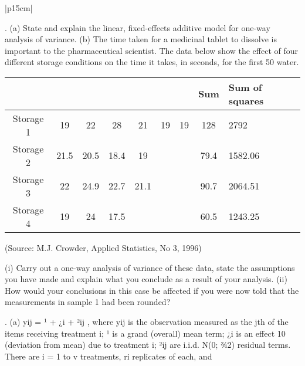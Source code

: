 \documentclass[a4paper,12pt]{article}
\begin{document}
\begin{table}[ht!]
     
\centering
     
\begin{tabular}{|p{15cm}|}
     
. (a) State and explain the linear, fixed-effects additive model for one-way analysis of
variance.
(b) The time taken for a medicinal tablet to dissolve is important to the pharmaceutical
scientist. The data below show the effect of four different storage conditions on the
time it takes, in seconds, for the first 50%
water.


\begin{center}
\begin{tabular}{|c|c|c|c|c|c|c|c|}

	&		&		&		&		&		&		&	Sum	&	 Sum of
squares	\\  \hline
Storage 1 	&	19	&	22	&	28	&	21	&	19	&	19	&	128	&	2792	\\  \hline
Storage 2 	&	21.5	&	20.5	&	18.4	&	19	&		&		&	79.4	&	1582.06	\\  \hline
Storage 3 	&	22	&	24.9	&	22.7	&	21.1	&		&		&	90.7	&	2064.51	\\  \hline
Storage 4	&	19	&	24	&	17.5	&		&		&		&	60.5	&	1243.25	\\  \hline
\end{tabular}
\end{center}
(Source: M.J. Crowder, Applied Statistics, No 3, 1996)

(i) Carry out a one-way analysis of variance of these data, state the assumptions you
have made and explain what you conclude as a result of your analysis.
(ii) How would your conclusions in this case be affected if you were now told that the
measurements in sample 1 had been rounded?
\\ \hline
      
\end{tabular}
    
\end{table}
. (a) yij = ¹ + ¿i + ²ij , where yij is the observation measured as the jth of the
items receiving treatment i; ¹ is a grand (overall) mean term; ¿i is an effect
10
(deviation from mean) due to treatment i; ²ij are i.i.d. N(0; ¾2) residual
terms. There are i = 1 to v treatments, ri replicates of each, and
\end{document}
